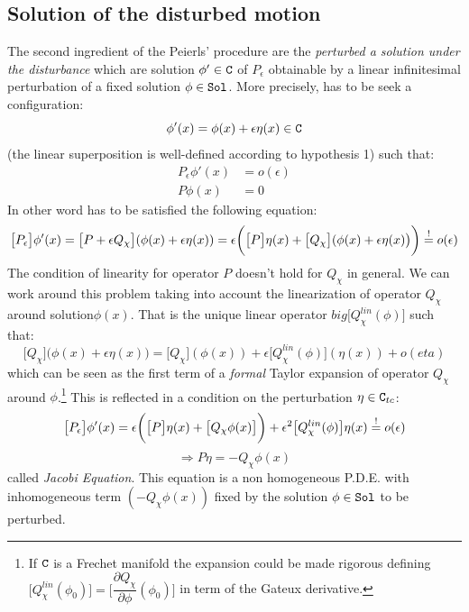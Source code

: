 \documentclass[Main]{subfiles}
\begin{document}
	\subsection{Solution of the disturbed motion}
		The second ingredient of the Peierls' procedure are the \emph{perturbed a solution under the disturbance} which are solution $\phi'\in \mathtt{C}$ of $P_\epsilon$ obtainable by a linear infinitesimal perturbation of a fixed solution $\phi \in \mathtt{Sol}$.
		More precisely, has to be seek a configuration:
			\begin{displaymath}
					\phi'(x) = \phi(x) + \epsilon \eta(x) \in \mathtt{C}
			\end{displaymath}
		(the linear superposition is well-defined according to hypothesis 1) such that:
			\begin{align*} 
				P_\epsilon \phi'(x) &= o(\epsilon)  \\ 
				P \phi(x) &= 0
			\end{align*}
		In other word has to be satisfied the following equation:
		\begin{displaymath}
			\big[P_\epsilon\big] \phi'(x) = \big[ P + \epsilon Q_\chi		\big]( \phi(x) + \epsilon \eta(x)) 
			= \epsilon \biggr( \big[P\big] \eta(x) + \big[Q_\chi \big]( \phi(x) + \epsilon \eta(x)\big)\biggr) \overset{!}{=} o(\epsilon)			
		\end{displaymath}
		The condition of linearity for operator $P$ doesn't hold for $Q_\chi$ in general.
		We can work around this problem taking into account the linearization\cite[pag. 31]{Khavkine2014} of operator $Q_\chi$ around solution$\phi(x)$. That is the unique linear operator $big[Q_\chi^{lin}(\phi) \big]$ such that:
		\begin{displaymath}
			\big[Q_\chi \big]( \phi(x) + \epsilon \eta(x)\big)= \big[Q_\chi \big]( \phi(x)) + \epsilon \big[Q_\chi^{lin}(\phi)  \big]( \eta(x)) + o(eta)
		\end{displaymath}
		which can be seen as the first term of a \emph{formal} Taylor expansion of operator $Q_\chi$ around $\phi$.\danger\footnote{If $\mathtt{C}$ is a Frechet manifold the expansion could be made rigorous defining $\big[Q_\chi^{lin}(\phi_0)  \big] = \big[\dfrac{\partial Q_\chi}{\partial \phi} (\phi_0)\big] $ in term of the Gateux derivative.}
		This is reflected in a condition on the perturbation $\eta \in \mathtt{C}_{tc}$:
		\begin{displaymath}
			\big[P_\epsilon\big] \phi'(x) =  \epsilon \biggr( \big[P\big] \eta(x) + \big[Q_\chi \phi(x) \big]\biggr)+ \epsilon^2 \big[Q_\chi^{lin}(\phi)  \big]	\eta(x) \overset{!}{=} o(\epsilon)
		\end{displaymath}
		\begin{equation}\label{PeierlJacobiEqLin}
			\Rightarrow P \eta = - Q_\chi \phi(x)
		\end{equation}
		called \emph{Jacobi Equation}.
		This equation is a non homogeneous P.D.E. with inhomogeneous term $ (- Q_\chi \phi(x))$ fixed by the solution $\phi\in \mathtt{Sol}$ to be perturbed.
\end{document}
